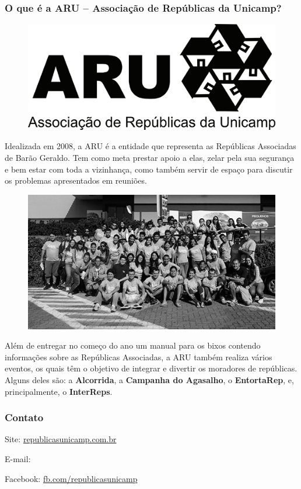 \subsubsection*{O que é a ARU – Associação de Repúblicas da Unicamp?}

\begin{figure}[H]
    \centering
    \includegraphics[width=.35\textwidth]{img/alem_da_graduacao/aru_logo.png}
\end{figure}

Idealizada em 2008, a ARU é a entidade que representa as Repúblicas Associadas
de Barão Geraldo.  Tem como meta prestar apoio a elas, zelar pela sua segurança
e bem estar com toda a vizinhança, como também servir de espaço para discutir os
problemas apresentados em reuniões.

\begin{figure}[H]
    \centering
    \includegraphics[width=.45\textwidth]{img/alem_da_graduacao/aru_foto.jpg}
\end{figure}

Além de entregar no começo do ano um manual para os bixos contendo informações
sobre as Repúblicas Associadas, a ARU também realiza vários eventos, os quais
têm o objetivo de integrar e divertir os moradores de repúblicas. Alguns deles
são: a \textbf{Alcorrida}, a \textbf{Campanha do Agasalho}, o
\textbf{EntortaRep}, e, principalmente, o \textbf{InterReps}.

\subsubsection*{Contato}

\begin{compactitemize}
    \item Site: \url{republicasunicamp.com.br}
    \item E-mail: 
    \item Facebook: \url{fb.com/republicasunicamp}
\end{compactitemize}

